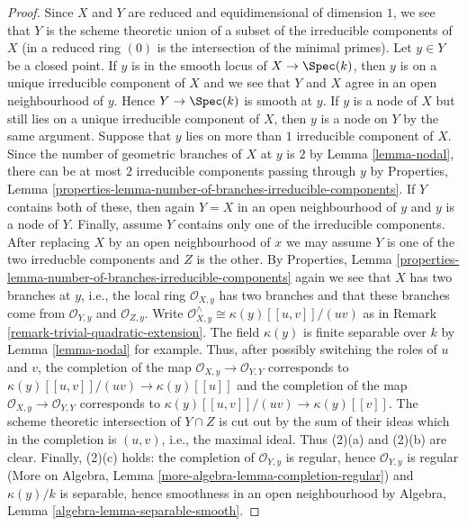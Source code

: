 \begin{proof}
Since $X$ and $Y$ are reduced and equidimensional of dimension $1$,
we see that $Y$ is the scheme theoretic union of a subset of the
irreducible components of $X$ (in a reduced ring $(0)$
is the intersection of the minimal primes).
Let $y \in Y$ be a closed point.
If $y$ is in the smooth locus of
$X \to \Spec(k)$, then $y$ is on a unique irreducible component
of $X$ and we see that $Y$ and $X$ agree in an open neighbourhood
of $y$. Hence $Y \to \Spec(k)$ is smooth at $y$.
If $y$ is a node of $X$ but still lies on a unique irreducible
component of $X$, then $y$ is a node on $Y$ by the same argument.
Suppose that $y$ lies on more than $1$ irreducible component of $X$.
Since the number of geometric branches of $X$ at $y$ is $2$
by Lemma \ref{lemma-nodal},
there can be at most $2$ irreducible components passing through $y$
by Properties, Lemma
\ref{properties-lemma-number-of-branches-irreducible-components}.
If $Y$ contains both of these, then again $Y = X$ in an open neighbourhood
of $y$ and $y$ is a node of $Y$. Finally, assume $Y$ contains only one
of the irreducible components. After replacing $X$ by an open
neighbourhood of $x$ we may assume $Y$ is one of the two
irreducble components and $Z$ is the other. By Properties, Lemma
\ref{properties-lemma-number-of-branches-irreducible-components}
again we see that $X$ has two branches at $y$, i.e., the local ring
$\mathcal{O}_{X, y}$ has two branches and that these branches
come from $\mathcal{O}_{Y, y}$ and $\mathcal{O}_{Z, y}$. Write
$\mathcal{O}_{X, y}^\wedge \cong \kappa(y)[[u, v]]/(uv)$
as in Remark \ref{remark-trivial-quadratic-extension}.
The field $\kappa(y)$ is finite separable over $k$ by
Lemma \ref{lemma-nodal} for example.
Thus, after possibly switching the roles of $u$ and $v$,
the completion of the map
$\mathcal{O}_{X, y} \to \mathcal{O}_{Y, Y}$
corresponds to $\kappa(y)[[u, v]]/(uv) \to \kappa(y)[[u]]$
and the completion of the map
$\mathcal{O}_{X, y} \to \mathcal{O}_{Y, Y}$
corresponds to $\kappa(y)[[u, v]]/(uv) \to \kappa(y)[[v]]$.
The scheme theoretic intersection of $Y \cap Z$ is cut out
by the sum of their ideas which in the completion is $(u, v)$, i.e.,
the maximal ideal. Thus (2)(a) and (2)(b) are clear.
Finally, (2)(c) holds: the completion of $\mathcal{O}_{Y, y}$
is regular, hence $\mathcal{O}_{Y, y}$ is regular
(More on Algebra, Lemma \ref{more-algebra-lemma-completion-regular})
and $\kappa(y)/k$ is separable, hence
smoothness in an open neighbourhood
by Algebra, Lemma \ref{algebra-lemma-separable-smooth}.
\end{proof}




